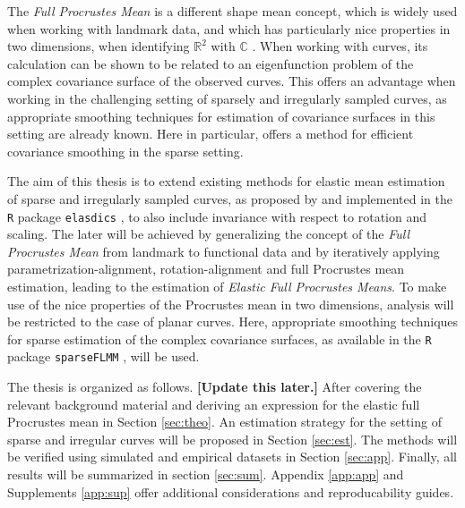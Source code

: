 The \textit{Full Procrustes Mean} is a different shape mean concept, which is widely used when working with landmark data, and which has particularly nice properties in two dimensions, when identifying $\mathbb{R}^2$ with $\mathbb{C}$ \parencite[see][Chap.\ 8]{DrydenMardia2016}.
When working with curves, its calculation can be shown to be related to an eigenfunction problem of the complex covariance surface of the observed curves.
This offers an advantage when working in the challenging setting of sparsely and irregularly sampled curves, as appropriate smoothing techniques for estimation of covariance surfaces in this setting are already known.
Here in particular, \cite{CederbaumScheiplGreven2018} offers a method for efficient covariance smoothing in the sparse setting. 

The aim of this thesis is to extend existing methods for elastic mean estimation of sparse and irregularly sampled curves, as proposed by \cite{Steyer2021} and implemented in the \texttt{R} package \texttt{elasdics} \parencite{elasdics}, to also include invariance with respect to rotation and scaling.
The later will be achieved by generalizing the concept of the \textit{Full Procrustes Mean} from landmark to functional data and by iteratively applying parametrization-alignment, rotation-alignment and full Procrustes mean estimation, leading to the estimation of \textit{Elastic Full Procrustes Means}.
To make use of the nice properties of the Procrustes mean in two dimensions, analysis will be restricted to the case of planar curves.
Here, appropriate smoothing techniques for sparse estimation of the complex covariance surfaces, as available in the \texttt{R} package \texttt{sparseFLMM} \parencite{sparseFLMM}, will be used.

The thesis is organized as follows. 
\textbf{[Update this later.]}
After covering the relevant background material and deriving an expression for the elastic full Procrustes mean in Section \ref{sec:theo}.
An estimation strategy for the setting of sparse and irregular curves will be proposed in Section \ref{sec:est}.
The methods will be verified using simulated and empirical datasets in Section \ref{sec:app}.
Finally, all results will be summarized in section \ref{sec:sum}.
Appendix \ref{app:app} and Supplements \ref{app:sup} offer additional considerations and reproducability guides.

\newpage
